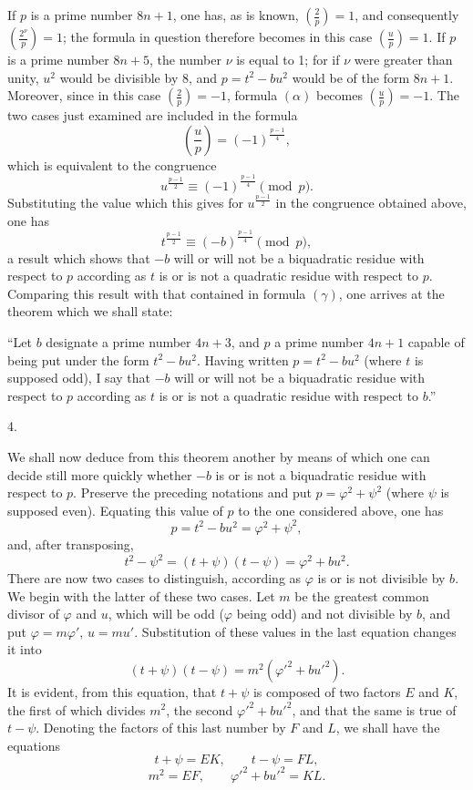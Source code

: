 \documentclass[11pt]{article}
\newcommand{\leg}[2]{\left(\frac{#1}{#2}\right)}
\newcommand{\unitid}[1]{\hypertarget{#1}{}}
\begin{document}
\unitid{dirichlet.v1.p04a.en.par.021}If $p$ is a prime number $8n+1$, one has, as is known, $\leg{2}{p}=1$, and consequently $\leg{2^\nu}{p}=1$; the formula in question therefore becomes in this case $\leg{u}{p}=1$. If $p$ is a prime number $8n+5$, the number $\nu$ is equal to 1; for if $\nu$ were greater than unity, $u^2$ would be divisible by 8, and $p=t^2-bu^2$ would be of the form $8n+1$. Moreover, since in this case $\leg{2}{p}=-1$, formula $(\alpha)$ becomes $\leg{u}{p}=-1$. The two cases just examined are included in the formula
\[
 \leg{u}{p}=(-1)^{\frac{p-1}{4}},
\]
which is equivalent to the congruence
\[
 u^{\frac{p-1}{2}}\equiv (-1)^{\frac{p-1}{4}}\pmod p.
\]
Substituting the value which this gives for $u^{\frac{p-1}{2}}$ in the congruence obtained above, one has
\[
 t^{\frac{p-1}{2}}\equiv (-b)^{\frac{p-1}{4}}\pmod p,
\]
a result which shows that $-b$ will or will not be a biquadratic residue with respect to $p$ according as $t$ is or is not a quadratic residue with respect to $p$. Comparing this result with that contained in formula $(\gamma)$, one arrives at the theorem which we shall state:

\unitid{dirichlet.v1.p04a.en.thm.006}“Let $b$ designate a prime number $4n+3$, and $p$ a prime number $4n+1$ capable of being put under the form $t^2-bu^2$. Having written $p=t^2-bu^2$ (where $t$ is supposed odd), I say that $-b$ will or will not be a biquadratic residue with respect to $p$ according as $t$ is or is not a quadratic residue with respect to $b$.”

\begin{center}4.\end{center}

\unitid{dirichlet.v1.p04a.en.par.022}We shall now deduce from this theorem another by means of which one can decide still more quickly whether $-b$ is or is not a biquadratic residue with respect to $p$. Preserve the preceding notations and put $p=\varphi^2+\psi^2$ (where $\psi$ is supposed even). Equating this value of $p$ to the one considered above, one has
\[
 p=t^2-bu^2=\varphi^2+\psi^2,
\]
and, after transposing,
\[
 t^2-\psi^2=(t+\psi)(t-\psi)=\varphi^2+bu^2.
\]
There are now two cases to distinguish, according as $\varphi$ is or is not divisible by $b$. We begin with the latter of these two cases. Let $m$ be the greatest common divisor of $\varphi$ and $u$, which will be odd ($\varphi$ being odd) and not divisible by $b$, and put $\varphi=m\varphi'$, $u=mu'$. Substitution of these values in the last equation changes it into
\[
 (t+\psi)(t-\psi)=m^2(\varphi'^2+bu'^2).
\]
It is evident, from this equation, that $t+\psi$ is composed of two factors $E$ and $K$, the first of which divides $m^2$, the second $\varphi'^2+bu'^2$, and that the same is true of $t-\psi$. Denoting the factors of this last number by $F$ and $L$, we shall have the equations
\[
 t+\psi=EK,
\qquad t-\psi=FL,
\]
\[
 m^2=EF,
\qquad \varphi'^2+bu'^2=KL.
\]
\end{document}
